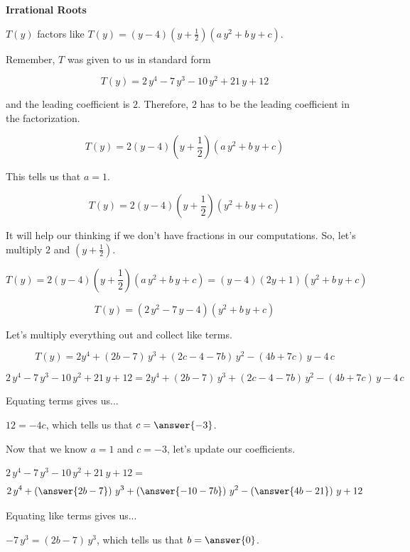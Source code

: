 \documentclass{ximera}
\begin{document}
\begin{explanation} \textbf{\textcolor{red!75!green}{Irrational Roots}} 



$T(y)$ factors like $T(y) = (y-4) \left(y+\frac{1}{2}\right) (a \, y^2 + b \, y + c)$. 


Remember, $T$ was given to us in standard form

\[   T(y) = 2\, y^4 - 7 \, y^3 - 10 \, y^2 + 21 \, y + 12   \]


and the leading coefficient is $2$.  Therefore, $2$ has to be the leading coefficient in the factorization.

\[   T(y) = 2 (y-4) \left(y+\frac{1}{2}\right) (a \, y^2 + b \, y + c)   \]

This tells us that $a = 1$.


\[   T(y) = 2 (y-4) \left(y+\frac{1}{2}\right) (y^2 + b \, y + c)   \]




 It will help our thinking if we don't have fractions in our computations. So, let's multiply $2$ and $\left(y+\frac{1}{2}\right)$.



\[
T(y) = 2 (y-4) \left(y+\frac{1}{2}\right) (a \, y^2 + b \, y + c) = (y-4) (2y+1) (y^2 + b \, y + c)
\]


\[
T(y) = (2 \, y^2 - 7 \, y - 4) (y^2 + b \, y + c)
\]


Let's multiply everything out and collect like terms.


\[
T(y) = 2 y^4 + (2 b - 7) \, y^3 + (2c - 4 - 7 b) \, y^2 - (4 b + 7 c) \, y - 4 \, c
\]


\[
2\, y^4 - 7 \, y^3 - 10 \, y^2 + 21 \, y + 12 = 2 y^4 + (2 b - 7) \, y^3 + (2c - 4 - 7 b) \, y^2 - (4 b + 7 c) \, y - 4 \, c
\]


Equating terms gives us...



$12 = -4 c$, which tells us that $c =  \answer{-3}$. 



Now that we know $a = 1$ and $c = -3$, let's update our coefficients.


$2\, y^4 - 7 \, y^3 - 10 \, y^2 + 21 \, y + 12 =$
\[
2 \, y^4 + \left( \answer{2 b - 7 } \right) \, y^3 + \left( \answer{-10 - 7 b} \right) \, y^2 - \left( \answer{4 b - 21} \right) \, y + 12
\]




Equating like terms gives us...


$-7 \, y^3 = (2 b - 7) \, y^3$, which tells us that $b = \answer{0}$. 




\end{explanation}
\end{document}
